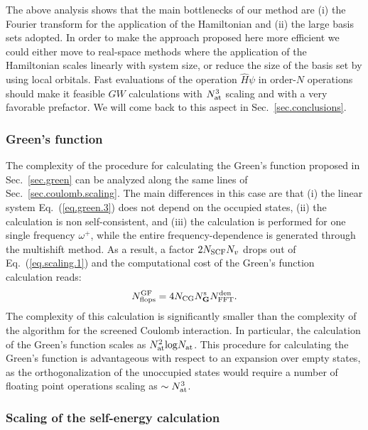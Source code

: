\documentclass[twocolumn,prb,showpacs,superscriptaddress]{revtex4}
\def\w{\omega}
\def\G{{\bf G}}
\begin{document}
The above analysis shows that the main bottlenecks of our method 
are (i) the Fourier transform for the application of the Hamiltonian and (ii) the large basis sets adopted.
In order to make the approach proposed here more efficient we could either
move to real-space methods where the application of the Hamiltonian scales linearly with system size,\cite{chelikowsky}
or reduce the size of the basis set by using local orbitals.\cite{siesta} 
Fast evaluations of the operation $\hat{H}\psi$ in order-$N$ operations should 
make it feasible $GW$ calculations with $N_{\rm at}^3$ scaling and with a very favorable
prefactor. We will come back to this aspect in Sec.\ \ref{sec.conclusions}.

\subsubsection{Green's function}\label{sec.green.scaling}

The complexity of the procedure for calculating the Green's function proposed
in Sec.\ \ref{sec.green} can be analyzed along the same
lines of Sec.\ \ref{sec.coulomb.scaling}. The main differences in this case are that (i) the linear system
Eq.\ (\ref{eq.green.3}) does not depend on the occupied states,
(ii) the calculation is non self-consistent, and (iii) the calculation is performed
for one single frequency $\w^+$, while the entire frequency-dependence is generated
through the multishift method. As a result, a factor $2 N_{\rm SCF} N_v$ drops out
of Eq.\ (\ref{eq.scaling.1}) and the computational cost of the Green's function
calculation reads:
   \begin{equation}\label{eq.scaling.3}
   N^{\rm GF}_{\rm flops} = 4 N_{\rm CG} N_\G^{\rm s} N^{\rm den}_{\rm FFT}.
   \end{equation}
The complexity of this calculation is significantly smaller than the complexity
of the algorithm for the screened Coulomb interaction. In particular, the
calculation of the Green's function scales as $N_{\rm at}^2 {\rm log} N_{\rm at}$.
This procedure for calculating the Green's function is advantageous
with respect to an expansion over empty states, as the orthogonalization
of the unoccupied states would require a number of floating point operations 
scaling as $\sim N_{\rm at}^3$.

\subsubsection{Scaling of the self-energy calculation}\label{sec.sigma.scaling}
\end{document}
